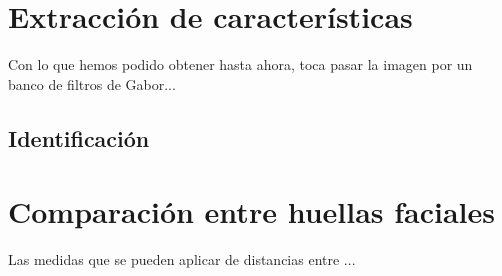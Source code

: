 \section{Extracción de características}
Con lo que hemos podido obtener hasta ahora, toca pasar la imagen por un banco de filtros de Gabor... 

\subsection{Identificación}

\section{Comparación entre huellas faciales}
Las medidas que se pueden aplicar de distancias entre ...
